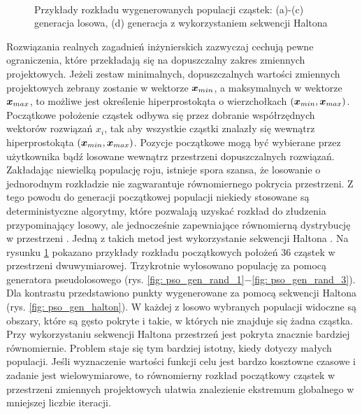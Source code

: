 \begin{figure}[hbt!]
	\centering
	\\
	\captionsetup{justification=centering}
	\caption{Przykłady rozkładu wygenerowanych populacji cząstek: (a)-(c) generacja losowa, (d) generacja z wykorzystaniem sekwencji Haltona}
	\label{fig: pso_gen_expl}
\end{figure}

Rozwiązania realnych zagadnień inżynierskich zazwyczaj cechują pewne ograniczenia, które przekładają się na dopuszczalny zakres zmiennych projektowych. Jeżeli zestaw minimalnych, dopuszczalnych wartości zmiennych projektowych zebrany zostanie w wektorze $\bm{x}_{min}$, a maksymalnych w wektorze $\bm{x}_{max}$, to możliwe jest określenie hiperprostokąta o wierzchołkach $(\bm{x}_{min},\bm{x}_{max})$. Początkowe położenie cząstek odbywa się przez dobranie współrzędnych wektorów rozwiązań $x_i$, tak aby wszystkie cząstki znalazły się wewnątrz hiperprostokąta $(\bm{x}_{min},\bm{x}_{max})$. Pozycje początkowe mogą być wybierane przez użytkownika bądź losowane wewnątrz przestrzeni dopuszczalnych rozwiązań. Zakładając niewielką populację roju, istnieje spora szansa, że losowanie o jednorodnym rozkładzie nie zagwarantuje równomiernego pokrycia przestrzeni. Z tego powodu do generacji początkowej populacji niekiedy stosowane są deterministyczne algorytmy, które pozwalają uzyskać rozkład do złudzenia przypominający losowy, ale jednocześnie zapewniające równomierną dystrybucję w przestrzeni \parencite{Saliby2002}. Jedną z takich metod jest wykorzystanie sekwencji Haltona \parencite{Tesch2016}. Na rysunku \ref{fig: pso_gen_expl} pokazano przykłady rozkładu początkowych położeń 36 cząstek w przestrzeni dwuwymiarowej. Trzykrotnie wylosowano populację za pomocą generatora pseudolosowego (rys. \ref{fig: pso_gen_rand_1}$-$\ref{fig: pso_gen_rand_3}). Dla kontrastu przedstawiono punkty wygenerowane za pomocą sekwencji Haltona (rys. \ref{fig: pso_gen_halton}). W każdej z losowo wybranych populacji widoczne są obszary, które są gęsto pokryte i takie, w których nie znajduje się żadna cząstka. Przy wykorzystaniu sekwencji Haltona przestrzeń jest pokryta znacznie bardziej równomiernie. Problem staje się tym bardziej istotny, kiedy dotyczy małych populacji. Jeśli wyznaczenie wartości funkcji celu jest bardzo kosztowne czasowe i zadanie jest wielowymiarowe, to równomierny rozkład początkowy cząstek w przestrzeni zmiennych projektowych ułatwia znalezienie ekstremum globalnego w mniejszej liczbie iteracji.

